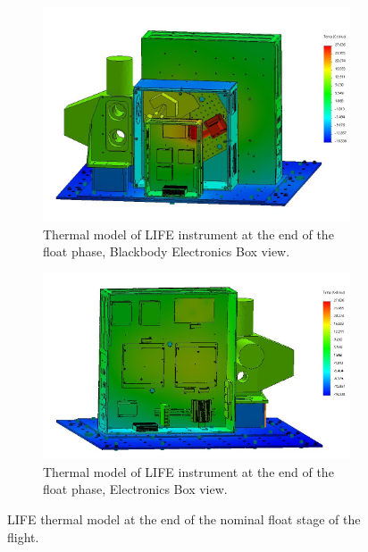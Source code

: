 \begin{figure}
    \centering
    \begin{subfigure}[h]{0.9\textwidth}
        \centering
        \includegraphics[width=\textwidth]{chap4_images/float_images/Test_16_BBEbox.JPG}
        \caption{Thermal model of LIFE instrument at the end of the float phase, Blackbody Electronics Box view.}
        \label{fig:float_model_ebox}
    \end{subfigure}
    \begin{subfigure}[h]{0.9\textwidth}
        \centering
        \includegraphics[width=\textwidth]{chap4_images/float_images/Test_16_Ebox.JPG}
        \caption{Thermal model of LIFE instrument at the end of the float phase, Electronics Box view.}
        \label{float_model_ebox}
    \end{subfigure}
    \caption{LIFE thermal model at the end of the nominal float stage of the flight.}
    \label{float_model}
\end{figure}

